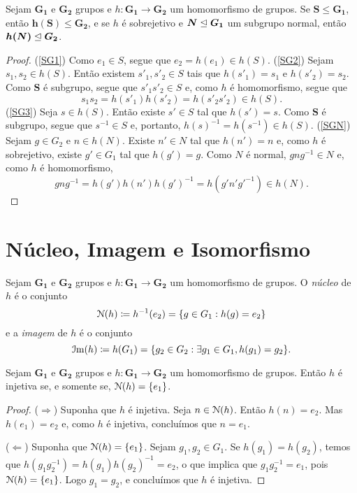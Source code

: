 \begin{prop}
\label{alge:prop.gru.hom}
Sejam $\bm{G_1}$ e $\bm{G_2}$ grupos e $h: \bm{G_1} \to \bm{G_2}$ um homomorfismo de grupos. Se $\bm S \leq \bm{G_1}$, então $\bm{h(S)} \leq \bm{G_2}$, e se $h$ é sobrejetivo e $\bm N \mathrel{\unlhd} \bm{G_1}$ um subgrupo normal, então $\bm{h(N)} \mathrel{\unlhd} \bm{G_2}$.
\end{prop}
\begin{proof}
(\ref{SG1}) Como $e_1 \in S$, segue que $e_2=h(e_1) \in h(S)$.
(\ref{SG2}) Sejam $s_1,s_2 \in h(S)$. Então existem $s'_1,s'_2 \in S$ tais que $h(s'_1)=s_1$ e $h(s'_2)=s_2$. Como $\bm S$ é subgrupo, segue que $s'_1s'_2 \in S$ e, como $h$ é homomorfismo, segue que
	\begin{equation*}
	s_1s_2 = h(s'_1)h(s'_2) = h(s'_2s'_2) \in h(S).
	\end{equation*}
(\ref{SG3}) Seja $s \in h(S)$. Então existe $s' \in S$ tal que $h(s')=s$. Como $\bm S$ é subgrupo, segue que $s^{-1} \in S$ e, portanto, $h(s)^{-1} = h(s^{-1}) \in h(S)$. (\ref{SGN}) Sejam $g \in G_2$ e $n \in h(N)$. Existe $n' \in N$ tal que $h(n')=n$ e, como $h$ é sobrejetivo, existe $g' \in G_1$ tal que $h(g')=g$. Como $N$ é normal, $gng^{-1} \in N$ e, como $h$ é homomorfismo,
	\begin{equation*}
	gng^{-1} = h(g')h(n')h(g')^{-1} = h(g'n'g'^{-1}) \in h(N).
	\end{equation*}
\end{proof}

\section{Núcleo, Imagem e Isomorfismo}

\begin{defi}
Sejam $\bm{G_1}$ e $\bm{G_2}$ grupos e $h: \bm{G_1} \to \bm{G_2}$ um homomorfismo de grupos. O \emph{núcleo} de $h$ é o conjunto
	\begin{equation*}
	\mathcal{N}(h) \coloneqq h^{-1}(e_2) = \{g \in G_1 : h(g) = e_2\}
	\end{equation*}
e a \emph{imagem} de $h$ é o conjunto
	\begin{equation*}
	\mathcal{I}\mathrm{m}(h) \coloneqq h(G_1) = \{g_2 \in G_2 : \exists g_1 \in G_1, h(g_1) = g_2\}.
	\end{equation*}
\end{defi}

\begin{prop}
\label{pro:gru.nuc.inj}
Sejam $\bm{G_1}$ e $\bm{G_2}$ grupos e $h: \bm{G_1} \to \bm{G_2}$ um homomorfismo de grupos. Então $h$ é injetiva se, e somente se, $\mathcal{N}(h)=\{e_1\}$.
\end{prop}
\begin{proof}
($\Rightarrow$)	Suponha que $h$ é injetiva. Seja $n \in \mathcal{N}(h)$. Então $h(n)=e_2$. Mas $h(e_1)=e_2$ e, como $h$ é injetiva, concluímos que $n=e_1$.

\noindent
($\Leftarrow$) Suponha que $\mathcal{N}(h)=\{e_1\}$. Sejam $g_1,g_2 \in G_1$. Se $h(g_1)=h(g_2)$, temos que $h(g_1 g_2^{-1}) = h(g_1) h(g_2)^{-1} = e_2$, o que implica que $g_1 g_2^{-1} = e_1$, pois $\mathcal{N}(h)=\{e_1\}$. Logo $g_1=g_2$, e concluímos que $h$ é injetiva.
\end{proof}

